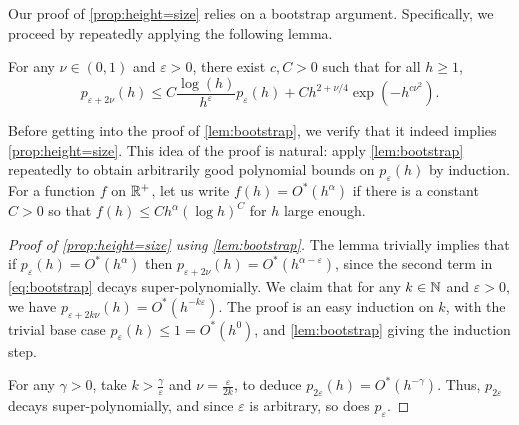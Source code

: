 \documentclass[11pt,reqno]{amsart}
\newcommand{\eps}{\varepsilon}
\begin{document}
Our proof of \cref{prop:height=size} relies on a bootstrap argument.
Specifically, we proceed by repeatedly applying the following lemma.

\begin{lem}\label{lem:bootstrap}
  For any $\nu \in (0,1)$ and $\varepsilon > 0$, there exist $c, C > 0$ such that for all $h\geq 1$,
  \begin{equation}\label{eq:bootstrap}
    p_{\varepsilon + 2\nu}(h) \leq C\frac{\log(h)}{h^{\varepsilon}}p_{\varepsilon}(h) + Ch^{2+\nu/4}\exp(-h^{c\nu^2}).
  \end{equation}
\end{lem}

Before getting into the proof of \cref{lem:bootstrap}, we verify that it indeed implies \cref{prop:height=size}.
This idea of the proof is natural: apply \cref{lem:bootstrap} repeatedly to obtain arbitrarily good polynomial bounds on $p_\eps(h)$ by induction.
For a function $f$ on $\mathbb{R}^+$, let us write $f(h)=O^*(h^\alpha)$ if there is a constant $C>0$ so that $f(h) \leq C h^\alpha (\log h)^{C}$ for $h$ large enough.

\begin{proof}[Proof of \cref{prop:height=size} using \cref{lem:bootstrap}]
  The lemma trivially implies that if $p_\eps(h) = O^*(h^\alpha)$ then $p_{\eps+2\nu}(h) = O^*(h^{\alpha-\eps})$, since the second term in \eqref{eq:bootstrap} decays super-polynomially.
  We claim that for any $k\in\mathbb{N}$ and $\eps>0$, we have $p_{\eps+2k\nu}(h) = O^*(h^{-k\eps})$.
  The proof is an easy induction on $k$, with the trivial base case $p_\eps(h)\leq 1 = O^*(h^0)$, and \cref{lem:bootstrap} giving the induction step.

  For any $\gamma>0$, take $k > \frac{\gamma}{\eps}$ and $\nu=\frac{\eps}{2k}$, to deduce $p_{2\eps}(h) = O^*(h^{-\gamma})$.
  Thus, $p_{2\eps}$ decays super-polynomially, and since $\eps$ is arbitrary, so does $p_\eps$.
\end{proof}
\end{document}
